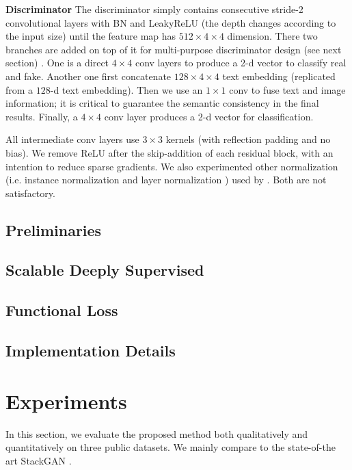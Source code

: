 \documentclass[10pt,twocolumn,letterpaper]{article}
\begin{document}
\textbf{Discriminator} The discriminator simply contains consecutive stride-2 convolutional layers with BN and LeakyReLU  (the depth changes according to the input size) until the feature map has $512{\times}4{\times}4$ dimension. There two branches are added on top of it for multi-purpose discriminator design (see next section) . One is a direct $4{\times}4$ conv layers to produce a 2-d vector to classify real and fake. Another one first concatenate $128{\times}4{\times}4$ text embedding (replicated from a $128$-d text embedding). Then we use an $1{\times}1$ conv to fuse text and image information; it is critical to guarantee the semantic consistency in the final results. Finally, a $4{\times}4$ conv layer produces a 2-d vector for classification. 

All intermediate conv layers use $3{\times}3$ kernels (with reflection padding and no bias). We remove ReLU after the skip-addition of each residual block, with an intention to reduce sparse gradients. We also experimented other normalization (i.e. instance normalization \cite{ulyanov2016instance} and layer normalization \cite{ba2016layer}) used by \cite{zhu2017unpaired,chen2017photographic}. Both are not satisfactory. 


\subsection{Preliminaries}

\subsection{Scalable Deeply Supervised}

\subsection{Functional Loss}

\subsection{Implementation Details}



\section{Experiments}
In this section, we evaluate the proposed method both qualitatively and quantitatively on three public datasets. We mainly compare to the state-of-the art StackGAN \cite{han2017stackgan}. 
\end{document}
